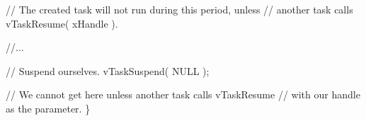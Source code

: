 \begin{DoxyPre}    // The created task will not run during this period, unless
    // another task calls vTaskResume( xHandle ).\end{DoxyPre}



\begin{DoxyPre}    //...\end{DoxyPre}



\begin{DoxyPre}    // Suspend ourselves.
    vTaskSuspend( NULL );\end{DoxyPre}



\begin{DoxyPre}    // We cannot get here unless another task calls vTaskResume
    // with our handle as the parameter.
\}
  \end{DoxyPre}
 